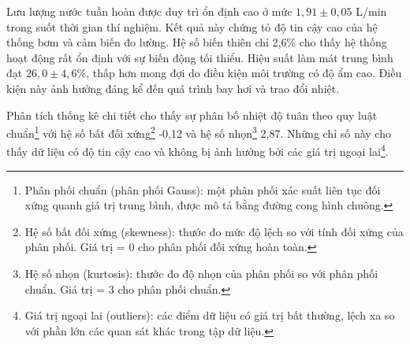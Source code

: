 \documentclass[../main.tex]{subfiles}
\begin{document}
Lưu lượng nước tuần hoàn được duy trì ổn định cao ở mức $1{,}91 \pm 0{,}05$ L/min trong suốt thời gian thí nghiệm. Kết quả này chứng tỏ độ tin cậy cao của hệ thống bơm và cảm biến đo lường. Hệ số biến thiên chỉ 2{,}6\% cho thấy hệ thống hoạt động rất ổn định với sự biến động tối thiểu. Hiệu suất làm mát trung bình đạt $26{,}0 \pm 4{,}6\%$, thấp hơn mong đợi do điều kiện môi trường có độ ẩm cao. Điều kiện này ảnh hưởng đáng kể đến quá trình bay hơi và trao đổi nhiệt.

\begin{table}[H]
\centering
\renewcommand{\arraystretch}{1.3}
\caption{Thống kê thông số vận hành theo khung giờ trong ngày}
\label{tab:temperature_statistics}
\end{table}

Phân tích thống kê chi tiết cho thấy sự phân bố nhiệt độ tuân theo quy luật chuẩn\footnote{Phân phối chuẩn (phân phối Gauss): một phân phối xác suất liên tục đối xứng quanh giá trị trung bình, được mô tả bằng đường cong hình chuông.} với hệ số bất đối xứng\footnote{Hệ số bất đối xứng (skewness): thước đo mức độ lệch so với tính đối xứng của phân phối. Giá trị = 0 cho phân phối đối xứng hoàn toàn.} -0,12 và hệ số nhọn\footnote{Hệ số nhọn (kurtosis): thước đo độ nhọn của phân phối so với phân phối chuẩn. Giá trị = 3 cho phân phối chuẩn.} 2,87. Những chỉ số này cho thấy dữ liệu có độ tin cậy cao và không bị ảnh hưởng bởi các giá trị ngoại lai\footnote{Giá trị ngoại lai (outliers): các điểm dữ liệu có giá trị bất thường, lệch xa so với phần lớn các quan sát khác trong tập dữ liệu.}.
\end{document}
